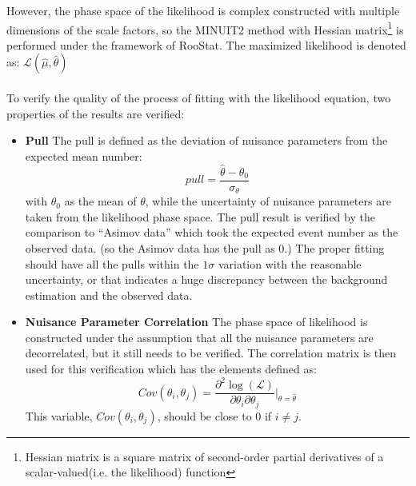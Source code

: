 However, the phase space of the likelihood is complex constructed with multiple dimensions of the scale factors, so the MINUIT2\cite{minuit} method with Hessian matrix\footnote{Hessian matrix is a square matrix of second-order partial derivatives of a scalar-valued(i.e. the likelihood) function} is performed under the framework of RooStat\cite{Moneta:2010pm}. The maximized likelihood is denoted as: $\mathcal{L}(\hat{\mu}, \hat{\theta})$
\\
\\To verify the quality of the process of fitting with the likelihood equation, two properties of the results are verified: 
\begin{itemize}
	\item {\bf Pull} The pull is defined as the deviation of nuisance parameters from the expected mean number:
	\begin{equation}
	pull=\frac{\hat{\theta}-\theta_0}{\sigma_{\theta}}
	\end{equation}
	with $\theta_0$ as the mean of $\theta$, while the uncertainty of nuisance parameters are taken from the likelihood phase space. The pull result is verified by the comparison to ``Asimov data'' which took the expected event number as the observed data. (so the Asimov data has the pull as 0.)  The proper fitting should have all the pulls within the $1\sigma$ variation with the reasonable uncertainty, or that indicates a huge discrepancy between the background estimation and the observed data. 
	\item {\bf Nuisance Parameter Correlation} The phase space of likelihood is constructed under the assumption that all the nuisance parameters are decorrelated, but it still needs to be verified. The correlation matrix is then used for this verification which has the elements defined as:
	\begin{equation}
	Cov(\theta_i, \theta_j) = \frac{\partial^2\log(\mathcal{L})}{\partial\theta_i \partial\theta_j}|_{\theta=\hat{\theta}}
	\end{equation}
	This variable, $Cov(\theta_i, \theta_j)$, should be close to 0 if $i\neq j$.
\end{itemize}
